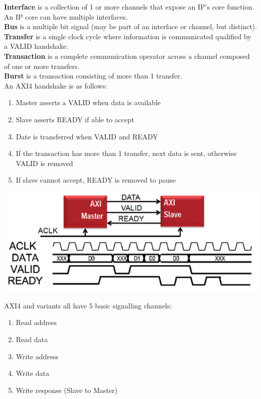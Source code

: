 \documentclass[11pt]{article}
\begin{document}
{    \textbf{Interface} is a collection of 1 or more channels that expose an IP's core function. An IP core can have multiple interfaces. \\

    \textbf{Bus} is a multiple bit signal (may be part of an interface or channel, but distinct). \\

    \textbf{Transfer} is a single clock cycle where information is communicated qualified by a VALID handshake. \\

    \textbf{Transaction} is a complete communication operator across a channel composed of one or more transfers. \\

    \textbf{Burst} is a transaction consisting of more than 1 transfer. \\

    An AXI4 handshake is as follows:

    \begin{enumerate}
        \item Master asserts a VALID when data is available
        \item Slave asserts READY if able to accept
        \item Date is transferred when VALID and READY
        \item If the transaction has more than 1 transfer, next data is sent, otherwise VALID is removed
        \item If slave cannot accept, READY is removed to pause
    \end{enumerate}

    \begin{center}
        \includegraphics[width=300 px]{handshake} 
    \end{center}    

    AXI4 and variants all have 5 basic signalling channels:

    \begin{enumerate}
        \item Read address
        \item Read data
        \item Write address
        \item Write data
        \item Write response (Slave to Master)
    \end{enumerate}

}
\end{document}
